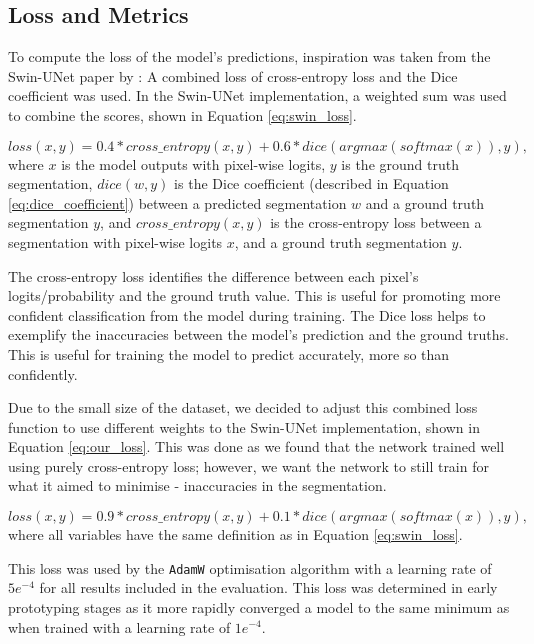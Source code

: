 \documentclass{l4proj}
\begin{document}
\subsection{Loss and Metrics}

To compute the loss of the model’s predictions, inspiration was taken from the Swin-UNet paper by \cite{cao2023swin}: A combined loss of cross-entropy loss and the Dice coefficient was used. In the Swin-UNet implementation, a weighted sum was used to combine the scores, shown in Equation \ref{eq:swin_loss}.

\begin{equation} \label{eq:swin_loss}
    loss(x, y) = 0.4 * cross\_entropy(x, y) + 0.6 * dice(argmax(softmax(x)), y),
\end{equation}    
where $x$ is the model outputs with pixel-wise logits, $y$ is the ground truth segmentation, $dice(w, y)$ is the Dice coefficient (described in Equation \ref{eq:dice_coefficient}) between a predicted segmentation $w$ and a ground truth segmentation $y$, and $cross\_entropy(x, y)$ is the cross-entropy loss between a segmentation with pixel-wise logits $x$, and a ground truth segmentation $y$.

The cross-entropy loss identifies the difference between each pixel’s logits/probability and the ground truth value. This is useful for promoting more confident classification from the model during training. The Dice loss helps to exemplify the inaccuracies between the model’s prediction and the ground truths. This is useful for training the model to predict accurately, more so than confidently.

Due to the small size of the dataset, we decided to adjust this combined loss function to use different weights to the Swin-UNet implementation, shown in Equation \ref{eq:our_loss}. This was done as we found that the network trained well using purely cross-entropy loss; however, we want the network to still train for what it aimed to minimise - inaccuracies in the segmentation.

\begin{equation} \label{eq:our_loss}
    loss(x, y) = 0.9 * cross\_entropy(x, y) + 0.1 * dice(argmax(softmax(x)), y),
\end{equation}    
where all variables have the same definition as in Equation \ref{eq:swin_loss}.

This loss was used by the \lstinline{AdamW} optimisation algorithm with a learning rate of $5e^{-4}$ for all results included in the evaluation. This loss was determined in early prototyping stages as it more rapidly converged a model to the same minimum as when trained with a learning rate of $1e^{-4}$.
\end{document}
